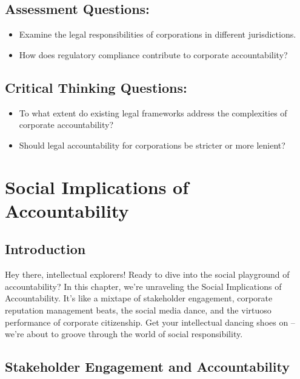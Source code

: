\documentclass[
  letterpaper,
  DIV=11,
  numbers=noendperiod]{scrreprt}
\begin{document}
\subsection{Assessment Questions:}\label{assessment-questions-3}

\begin{itemize}
\item
  Examine the legal responsibilities of corporations in different
  jurisdictions.
\item
  How does regulatory compliance contribute to corporate accountability?
\end{itemize}

\subsection{Critical Thinking
Questions:}\label{critical-thinking-questions-3}

\begin{itemize}
\item
  To what extent do existing legal frameworks address the complexities
  of corporate accountability?
\item
  Should legal accountability for corporations be stricter or more
  lenient?
\end{itemize}

\section{Social Implications of
Accountability}\label{social-implications-of-accountability}

\subsection{Introduction}\label{introduction-5}

Hey there, intellectual explorers! Ready to dive into the social
playground of accountability? In this chapter, we're unraveling the
Social Implications of Accountability. It's like a mixtape of
stakeholder engagement, corporate reputation management beats, the
social media dance, and the virtuoso performance of corporate
citizenship. Get your intellectual dancing shoes on -- we're about to
groove through the world of social responsibility.

\subsection{Stakeholder Engagement and
Accountability}\label{stakeholder-engagement-and-accountability}
\end{document}
